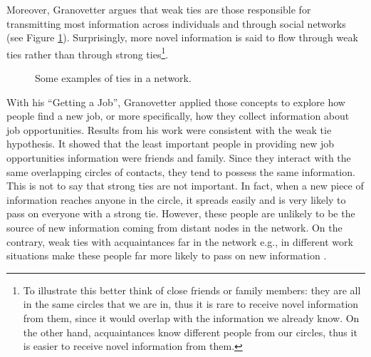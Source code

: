 Moreover, Granovetter argues that weak ties are those responsible
for transmitting most information across individuals and through social
networks (see Figure \ref{fig:Example-of-ties}). Surprisingly, more
novel information is said to flow through weak ties rather than through
strong ties\footnote{To illustrate this better think of close friends or family members:
they are all in the same circles that we are in, thus it is rare to
receive novel information from them, since it would overlap with the
information we already know. On the other hand, acquaintances know
different people from our circles, thus it is easier to receive novel
information from them. }.

\begin{figure}[h]
\centering{}\caption{Some examples of ties in a network.\label{fig:Example-of-ties}}
\end{figure}
With his \textquotedblleft Getting a Job\textquotedblright , Granovetter
applied those concepts to explore how people find a new job, or more
specifically, how they collect information about job opportunities.
Results from his work were consistent with the weak tie hypothesis.
It showed that the least important people in providing new job opportunities
information were friends and family. Since they interact with the
same overlapping circles of contacts, they tend to possess the same
information. This is not to say that strong ties are not important.
In fact, when a new piece of information reaches anyone in the circle,
it spreads easily and is very likely to pass on everyone with a strong
tie. However, these people are unlikely to be the source of new information
coming from distant nodes in the network. On the contrary, weak ties
with acquaintances far in the network \textendash{} e.g., in different
work situations \textendash{} make these people far more likely to
pass on new information \citep{Granovetter1974Getting-a-Job}.

